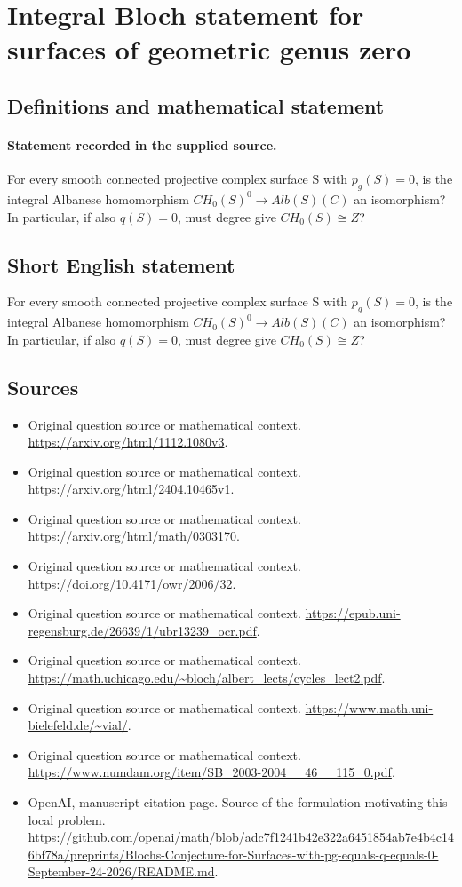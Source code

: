\documentclass[11pt]{article}
\begin{document}
\section*{Integral Bloch statement for surfaces of geometric genus zero}\label{statement}
\subsection{Definitions and mathematical statement}
\paragraph{Statement recorded in the supplied source.}
For every smooth connected projective complex surface S with $p_g(S)=0$, is the integral Albanese homomorphism $CH_{0}(S)^0\to Alb(S)(C)$ an isomorphism? In particular, if also $q(S)=0$, must degree give $CH_{0}(S)\cong Z$?
\subsection{Short English statement}
For every smooth connected projective complex surface S with $p_g(S)=0$, is the integral Albanese homomorphism $CH_{0}(S)^0\to Alb(S)(C)$ an isomorphism? In particular, if also $q(S)=0$, must degree give $CH_{0}(S)\cong Z$?
\subsection{Sources}
\begin{itemize}
\item[S1] Original question source or mathematical context.
\url{https://arxiv.org/html/1112.1080v3}.
\item[S2] Original question source or mathematical context.
\url{https://arxiv.org/html/2404.10465v1}.
\item[S3] Original question source or mathematical context.
\url{https://arxiv.org/html/math/0303170}.
\item[S4] Original question source or mathematical context.
\url{https://doi.org/10.4171/owr/2006/32}.
\item[S5] Original question source or mathematical context.
\url{https://epub.uni-regensburg.de/26639/1/ubr13239_ocr.pdf}.
\item[S6] Original question source or mathematical context.
\url{https://math.uchicago.edu/~bloch/albert_lects/cycles_lect2.pdf}.
\item[S7] Original question source or mathematical context.
\url{https://www.math.uni-bielefeld.de/~vial/}.
\item[S8] Original question source or mathematical context.
\url{https://www.numdam.org/item/SB_2003-2004__46__115_0.pdf}.
\item[S9] OpenAI, manuscript citation page. Source of the formulation motivating this local problem.
\url{https://github.com/openai/math/blob/adc7f1241b42e322a6451854ab7e4b4c146bf78a/preprints/Blochs-Conjecture-for-Surfaces-with-pg-equals-q-equals-0-September-24-2026/README.md}.
\end{itemize}
\end{document}

